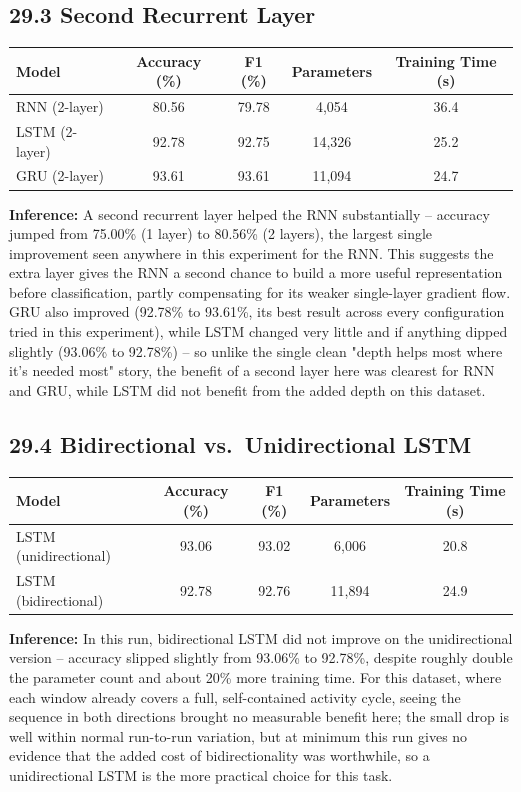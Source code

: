 \documentclass[10pt]{article}
\begin{document}
\subsection*{29.3 Second Recurrent Layer}

\begin{center}
\begin{tabular}{|l|c|c|c|c|}
\hline
Model & Accuracy (\%) & F1 (\%) & Parameters & Training Time (s)\\
\hline
RNN (2-layer) & 80.56 & 79.78 & 4,054 & 36.4\\
LSTM (2-layer) & 92.78 & 92.75 & 14,326 & 25.2\\
GRU (2-layer) & 93.61 & 93.61 & 11,094 & 24.7\\
\hline
\end{tabular}
\end{center}

\textbf{Inference:} A second recurrent layer helped the RNN substantially
-- accuracy jumped from 75.00\% (1 layer) to 80.56\% (2 layers), the
largest single improvement seen anywhere in this experiment for the RNN.
This suggests the extra layer gives the RNN a second chance to build a
more useful representation before classification, partly compensating for
its weaker single-layer gradient flow. GRU also improved (92.78\% to
93.61\%, its best result across every configuration tried in this
experiment), while LSTM changed very little and if anything dipped slightly
(93.06\% to 92.78\%) -- so unlike the single clean "depth helps most where
it's needed most" story, the benefit of a second layer here was clearest for
RNN and GRU, while LSTM did not benefit from the added depth on this
dataset.

\subsection*{29.4 Bidirectional vs.\ Unidirectional LSTM}

\begin{center}
\begin{tabular}{|l|c|c|c|c|}
\hline
Model & Accuracy (\%) & F1 (\%) & Parameters & Training Time (s)\\
\hline
LSTM (unidirectional) & 93.06 & 93.02 & 6,006 & 20.8\\
LSTM (bidirectional) & 92.78 & 92.76 & 11,894 & 24.9\\
\hline
\end{tabular}
\end{center}

\textbf{Inference:} In this run, bidirectional LSTM did not improve on the
unidirectional version -- accuracy slipped slightly from 93.06\% to
92.78\%, despite roughly double the parameter count and about 20\% more
training time. For this dataset, where each window already covers a full,
self-contained activity cycle, seeing the sequence in both directions
brought no measurable benefit here; the small drop is well within normal
run-to-run variation, but at minimum this run gives no evidence that the
added cost of bidirectionality was worthwhile, so a unidirectional LSTM is
the more practical choice for this task.
\end{document}
